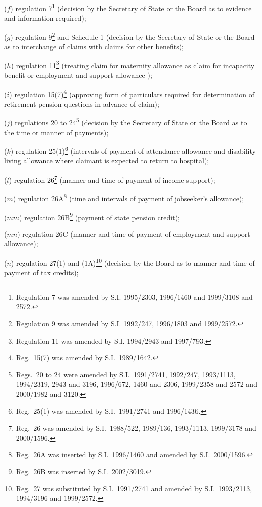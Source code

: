 \documentclass[12pt,a4paper]{article}
\begin{document}
\begin{enumerate}
($f$) regulation 7\footnote{Regulation 7 was amended by S.I. 1995/2303, 1996/1460 and 1999/3108 and 2572.} (decision by the Secretary of State or the Board as to evidence and information required);

($g$) regulation 9\footnote{Regulation 9 was amended by S.I. 1992/247, 1996/1803 and 1999/2572.} and Schedule 1 (decision by the Secretary of State or the Board as to interchange of claims with claims for other benefits);

($h$) regulation 11\footnote{Regulation 11 was amended by S.I. 1994/2943 and 1997/793.} (treating claim for maternity allowance as claim for incapacity benefit
or employment and support allowance%
);

($i$) regulation 15(7)\footnote{Reg.~15(7) was amended by S.I.~1989/1642.} (approving form of particulars required for determination of retirement pension questions in advance of claim);

($j$) regulations 20 to 24\footnote{Regs.~20 to 24 were amended by S.I.~1991/2741, 1992/247, 1993/1113, 1994/2319, 2943 and 3196, 1996/672, 1460 and 2306, 1999/2358 and 2572 and 2000/1982 and 3120.} (decision by the Secretary of State or the Board as to the time or manner of payments);

($k$) regulation 25(1)\footnote{Reg.~25(1) was amended by S.I.~1991/2741 and 1996/1436.} (intervals of payment of attendance allowance and disability living allowance where claimant is expected to return to hospital);

($l$) regulation 26\footnote{Reg.~26 was amended by S.I.~1988/522, 1989/136, 1993/1113, 1999/3178 and 2000/1596.} (manner and time of payment of income support);

($m$) regulation 26A\footnote{Reg.~26A was inserted by S.I.~1996/1460 and amended by S.I.~2000/1596.} (time and intervals of payment of jobseeker’s allowance);

($mm$) regulation 26B\footnote{Reg.~26B was inserted by S.I.~2002/3019.} (payment of state pension credit);

($mn$) regulation 26C (manner and time of payment of employment and support allowance);

($n$) regulation 27(1) and (1A)\footnote{Reg.~27 was substituted by S.I.~1991/2741 and amended by S.I.~1993/2113, 1994/3196 and 1999/2572.} (decision by the Board as to manner and time of payment of tax credits);


\end{enumerate}
\end{document}
